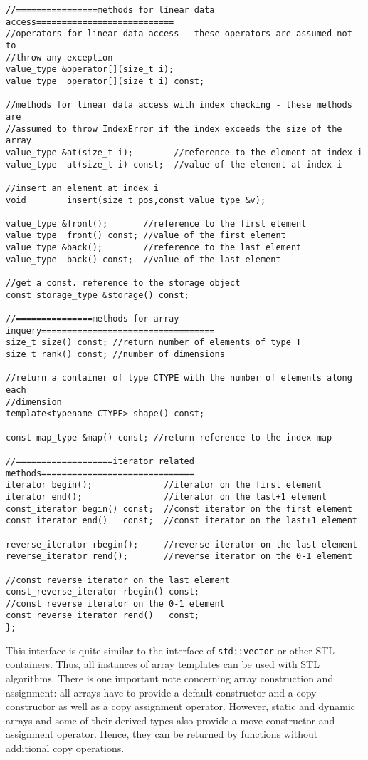 \begin{verbatim}
//================methods for linear data access===========================
//operators for linear data access - these operators are assumed not to
//throw any exception
value_type &operator[](size_t i);
value_type  operator[](size_t i) const;

//methods for linear data access with index checking - these methods are
//assumed to throw IndexError if the index exceeds the size of the array
value_type &at(size_t i);        //reference to the element at index i
value_type  at(size_t i) const;  //value of the element at index i

//insert an element at index i
void        insert(size_t pos,const value_type &v);

value_type &front();       //reference to the first element
value_type  front() const; //value of the first element
value_type &back();        //reference to the last element
value_type  back() const;  //value of the last element

//get a const. reference to the storage object
const storage_type &storage() const;

//===============methods for array inquery==================================
size_t size() const; //return number of elements of type T
size_t rank() const; //number of dimensions

//return a container of type CTYPE with the number of elements along each
//dimension
template<typename CTYPE> shape() const;

const map_type &map() const; //return reference to the index map

//===================iterator related methods==============================
iterator begin();              //iterator on the first element
iterator end();                //iterator on the last+1 element
const_iterator begin() const;  //const iterator on the first element
const_iterator end()   const;  //const iterator on the last+1 element

reverse_iterator rbegin();     //reverse iterator on the last element
reverse_iterator rend();       //reverse iterator on the 0-1 element

//const reverse iterator on the last element
const_reverse_iterator rbegin() const; 
//const reverse iterator on the 0-1 element
const_reverse_iterator rend()   const;
};
\end{verbatim}

This interface is quite similar to the interface of {\tt std::vector} or other
STL containers. Thus, all instances of array templates can be used with STL
algorithms. There is one important note concerning array construction and
assignment: all arrays have to provide a default constructor and a copy
constructor as well as a copy assignment operator. However, static and dynamic
arrays and some of their derived types also provide a move constructor and
assignment operator. Hence, they can be returned by functions without additional
copy operations.
